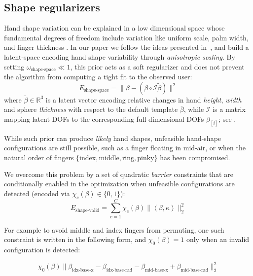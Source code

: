 \subsection{Shape regularizers}
\label{sec:shapeprior}
Hand shape variation can be explained in a low dimensional space whose fundamental degrees of freedom include variation like uniform scale, palm width, and finger thickness \cite{khamis15learning}. In our paper we follow the ideas presented in~\cite{edoardo}, and build a latent-space encoding hand shape variability through \emph{anisotropic scaling}. By setting $\omega_\text{shape-space}{\ll}1$, this prior acts as a soft regularizer and does not prevent the algorithm from computing a tight fit to the observed user:
% 
\begin{equation}
E_\text{shape-space} = \|\beta - (\bar{\beta} \circ \mathcal{I}\tilde{\beta}) \|^2
\label{eq:shapespace}
\end{equation}
% 
where $\tilde\beta \in \mathbb{R}^3$ is a latent vector encoding relative changes in hand \emph{height}, \emph{width} and sphere \emph{thickness} with respect to the default template $\bar\beta$, while $\mathcal{I}$ is a matrix mapping latent DOFs to the corresponding full-dimensional DOFs $\beta_{[i]}$; see . 
% 
\begin{edit}
While such prior can produce \emph{likely} hand shapes, unfeasible hand-shape configurations are still possible, such as a finger floating in mid-air, or when the natural order of fingers $\{\text{index},\text{middle},\text{ring},\text{pinky}\}$ has been compromised. 
\end{edit}
We overcome this problem by a set of quadratic \emph{barrier} constraints that are conditionally enabled in the optimization when unfeasible configurations are detected (encoded via $\chi_c(\beta) \in \{ 0,1 \}$):
% 
\begin{equation}
E_\text{shape-valid} = \sum_{c=1}^C \chi_c(\beta) \| \left< \beta, \kappa \right> \|_2^2
\label{eq:valideshape}
\end{equation}
% 
\begin{edit}
For example to avoid middle and index fingers from permuting, one such constraint is written in the following form, and $\chi_0(\beta)=1$ only when an invalid configuration is detected:
\end{edit}
% 
\begin{equation*}
\chi_0(\beta) \| \beta_\text{idx-base-x} - \beta_\text{idx-base-rad} - \beta_\text{mid-base-x} + \beta_\text{mid-base-rad} \|_2^2
\end{equation*}

